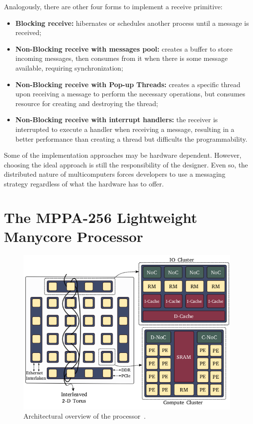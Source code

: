				Analogously, there are other four forms to implement a receive primitive:
				\begin{itemize}
					\item \textbf{Blocking receive:} \cpu hibernates or schedules another
						process until a message is received;
					\item \textbf{Non-Blocking receive with messages pool:} \cpu creates
						a buffer to store incoming messages, then consumes from it when
						there is some message available, requiring synchronization;
					\item \textbf{Non-Blocking receive with Pop-up Threads:} creates a specific
						thread upon receiving a message to perform the necessary operations,
						but consumes resource for creating and destroying the thread;
					\item \textbf{Non-Blocking receive with interrupt handlers:} the receiver
						is interrupted to execute a handler when receiving a message, resulting
						in a better performance than creating a thread but difficults
						the programmability.
				\end{itemize}

				Some of the implementation approaches may be hardware dependent.
				However, choosing the ideal approach is still the responsibility of the \os designer.
				Even so, the distributed nature of multicomputers forces developers to
				use a messaging strategy regardless of what the hardware has to offer.

\section{The MPPA-256 Lightweight Manycore Processor}
\label{sec.mppa}

	\begin{figure}[h]
		\centering
		\includegraphics[width=.7\textwidth]{images/arch-mppa.png}

		\caption{
		Architectural overview of the \mppa processor~\cite{Penna2018}.
		}\par
		\label{fig.mppa-arch}
	\end{figure}

